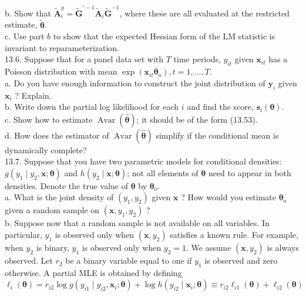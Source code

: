 \documentclass[10pt]{article}
\begin{document}
b. Show that $\tilde{\mathbf{A}}_{i}^{g}=\tilde{\mathbf{G}}^{\prime-1} \tilde{\mathbf{A}}_{i} \tilde{\mathbf{G}}^{-1}$, where these are all evaluated at the restricted estimate, $\tilde{\boldsymbol{\theta}}$.\\
c. Use part $b$ to show that the expected Hessian form of the LM statistic is invariant to reparameterization.\\
13.6. Suppose that for a panel data set with $T$ time periods, $y_{i t}$ given $\mathbf{x}_{i t}$ has a Poisson distribution with mean $\exp \left(\mathbf{x}_{i t} \boldsymbol{\theta}_{\mathrm{o}}\right), t=1, \ldots, T$.\\
a. Do you have enough information to construct the joint distribution of $\mathbf{y}_{i}$ given $\mathbf{x}_{i}$ ? Explain.\\
b. Write down the partial log likelihood for each $i$ and find the score, $\mathbf{s}_{i}(\boldsymbol{\theta})$.\\
c. Show how to estimate $\operatorname{Avar}(\hat{\boldsymbol{\theta}})$; it should be of the form (13.53).\\
d. How does the estimator of $\operatorname{Avar}(\hat{\boldsymbol{\theta}})$ simplify if the conditional mean is dynamically complete?\\
13.7. Suppose that you have two parametric models for conditional densities: $g\left(y_{1} \mid y_{2}, \mathbf{x} ; \boldsymbol{\theta}\right)$ and $h\left(y_{2} \mid \mathbf{x} ; \boldsymbol{\theta}\right)$; not all elements of $\boldsymbol{\theta}$ need to appear in both densities. Denote the true value of $\boldsymbol{\theta}$ by $\boldsymbol{\theta}_{\mathrm{o}}$.\\
a. What is the joint density of $\left(y_{1}, y_{2}\right)$ given $\mathbf{x}$ ? How would you estimate $\boldsymbol{\theta}_{\mathrm{o}}$ given a random sample on $\left(\mathbf{x}, y_{1}, y_{2}\right)$ ?\\
b. Suppose now that a random sample is not available on all variables. In particular, $y_{1}$ is observed only when $\left(\mathbf{x}, y_{2}\right)$ satisfies a known rule. For example, when $y_{2}$ is binary, $y_{1}$ is observed only when $y_{2}=1$. We assume $\left(\mathbf{x}, y_{2}\right)$ is always observed. Let $r_{2}$ be a binary variable equal to one if $y_{1}$ is observed and zero otherwise. A partial MLE is obtained by defining\\
$\ell_{i}(\boldsymbol{\theta})=r_{i 2} \log g\left(y_{i 1} \mid y_{i 2}, \mathbf{x}_{i} ; \boldsymbol{\theta}\right)+\log h\left(y_{i 2} \mid \mathbf{x}_{i} ; \boldsymbol{\theta}\right) \equiv r_{i 2} \ell_{i 1}(\boldsymbol{\theta})+\ell_{i 2}(\boldsymbol{\theta})$\\
\end{document}
